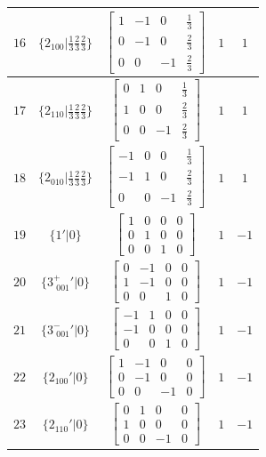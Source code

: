 \documentclass[fleqn,8pt]{jsarticle}
\begin{document}
\begin{longtable}{ccccc}
$ 16 $ & $ \{2{}_{100}|\frac{1}{3} \frac{2}{3} \frac{2}{3}\} $ & $ \begin{bmatrix} 1 & -1 & 0 & \frac{1}{3} \\ 0 & -1 & 0 & \frac{2}{3} \\ 0 & 0 & -1 & \frac{2}{3} \end{bmatrix} $ & $ 1 $ & $ 1 $ \\ \hline
$ 17 $ & $ \{2{}_{110}|\frac{1}{3} \frac{2}{3} \frac{2}{3}\} $ & $ \begin{bmatrix} 0 & 1 & 0 & \frac{1}{3} \\ 1 & 0 & 0 & \frac{2}{3} \\ 0 & 0 & -1 & \frac{2}{3} \end{bmatrix} $ & $ 1 $ & $ 1 $ \\ \hline
$ 18 $ & $ \{2{}_{010}|\frac{1}{3} \frac{2}{3} \frac{2}{3}\} $ & $ \begin{bmatrix} -1 & 0 & 0 & \frac{1}{3} \\ -1 & 1 & 0 & \frac{2}{3} \\ 0 & 0 & -1 & \frac{2}{3} \end{bmatrix} $ & $ 1 $ & $ 1 $ \\ \hline
$ 19 $ & $ \{1{}'|0\} $ & $ \begin{bmatrix} 1 & 0 & 0 & 0 \\ 0 & 1 & 0 & 0 \\ 0 & 0 & 1 & 0 \end{bmatrix} $ & $ 1 $ & $ -1 $ \\ \hline
$ 20 $ & $ \{3^{+}_{\,\,001}{}'|0\} $ & $ \begin{bmatrix} 0 & -1 & 0 & 0 \\ 1 & -1 & 0 & 0 \\ 0 & 0 & 1 & 0 \end{bmatrix} $ & $ 1 $ & $ -1 $ \\ \hline
$ 21 $ & $ \{3^{-}_{\,\,001}{}'|0\} $ & $ \begin{bmatrix} -1 & 1 & 0 & 0 \\ -1 & 0 & 0 & 0 \\ 0 & 0 & 1 & 0 \end{bmatrix} $ & $ 1 $ & $ -1 $ \\ \hline
$ 22 $ & $ \{2{}_{100}{}'|0\} $ & $ \begin{bmatrix} 1 & -1 & 0 & 0 \\ 0 & -1 & 0 & 0 \\ 0 & 0 & -1 & 0 \end{bmatrix} $ & $ 1 $ & $ -1 $ \\ \hline
$ 23 $ & $ \{2{}_{110}{}'|0\} $ & $ \begin{bmatrix} 0 & 1 & 0 & 0 \\ 1 & 0 & 0 & 0 \\ 0 & 0 & -1 & 0 \end{bmatrix} $ & $ 1 $ & $ -1 $ \\ \hline

\end{longtable}
\end{document}
